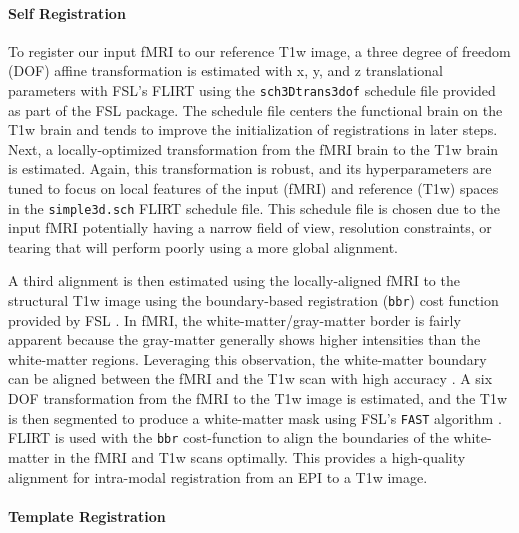 \documentclass[11pt]{article}
\begin{document}
\paragraph{Self Registration}

To register our input fMRI to our reference T1w image, a three degree of freedom (DOF) affine transformation is estimated with x, y, and z translational parameters with FSL's FLIRT \cite{Jenkinson2001} using the \texttt{sch3Dtrans3dof} schedule file provided as part of the FSL package. The schedule file centers the functional brain on the T1w brain  and tends to improve the initialization of registrations in later steps. Next, a locally-optimized transformation from the fMRI brain to the T1w brain is estimated. Again, this transformation is  robust, and  its hyperparameters are tuned to focus on local features of the input (fMRI) and reference (T1w) spaces in the \texttt{simple3d.sch} FLIRT schedule file. This schedule file is chosen due to the input fMRI potentially having a narrow field of view, resolution constraints, or tearing that will perform poorly using a more global alignment.

A third alignment is then estimated using the locally-aligned fMRI to the structural T1w image using the boundary-based registration (\texttt{bbr}) cost function provided by FSL \cite{Greve2009}. In  fMRI, the white-matter/gray-matter border is fairly apparent because the gray-matter generally shows higher intensities than the white-matter regions. Leveraging this observation, the white-matter boundary can be aligned between the fMRI and the T1w scan with high accuracy \cite{Greve2009}. A six DOF transformation from the fMRI to the T1w image is estimated, and the T1w is then segmented to produce a white-matter mask using FSL's \texttt{FAST} algorithm \cite{Zhang2001}. FLIRT is used with the \texttt{bbr}  cost-function to align the boundaries of the white-matter in the fMRI and T1w scans optimally. This provides a high-quality alignment for intra-modal registration from an EPI to a T1w image. 

\paragraph{Template Registration}

\end{document}
